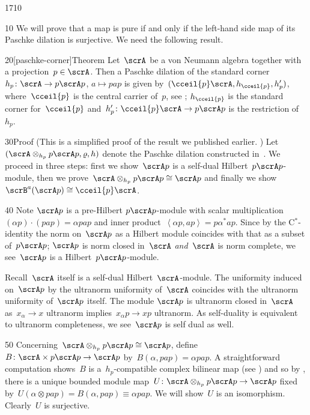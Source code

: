 \begin{parsec}{1710}%
\begin{point}{10}%
We will prove that a map is pure if and only if
    the left-hand side map of its Paschke dilation
    is surjective.  We need the following result.
\end{point}
\begin{point}{20}[paschke-corner]{Theorem}%
Let~$\scrA$ be a von Neumann algebra together with a projection~$p \in \scrA$.
Then a Paschke dilation of the standard corner~$h_p \colon \scrA \to p\scrA p$,
$a \mapsto pap$
is given by~$(\cceil{p}\scrA, h_{\cceil{p}}, h'_p)$,
    where~$\cceil{p}$ is the central  carrier of~$p$,
    see ;
    $h_{\cceil{p}}$ is the standard corner for~$\cceil{p}$
        and~$h'_p \colon \cceil{p} \scrA \to p\scrA p$
        is the restriction of~$h_p$.
\begin{point}{30}{Proof}%
(This is a simplified proof of the result we published earlier.
    \cite[thm.~28]{wwpaschke})
Let~$(\scrA \otimes_{h_p} p\scrA p, \varrho, h)$
    denote the Paschke dilation constructed in~.
We proceed in three steps:
    first we show~$\scrA p$ is a self-dual Hilbert~$p\scrA p$-module,
    then we prove~$\scrA \otimes_{h_p} p\scrA p \cong \scrA p$
    and finally we show~$\scrB^a(\scrA p) \cong \cceil{p} \scrA$.
\begin{point}{40}%
Note $\scrA p$ is a pre-Hilbert $p \scrA p$-module
    with scalar multiplication~$(\alpha p)\cdot (pap) = \alpha pap$
    and inner product~$\left<\alpha p, ap\right> = p\alpha^*ap$.
Since by the C$^*$-identity the norm on~$\scrA p$
    as a Hilbert module coincides with that as a subset of~$p \scrA p$;
    $\scrA p$ is norm closed in~$\scrA$ \emph{and}~$\scrA$ is norm complete,
    we see~$\scrA p$ is a Hilbert~$p \scrA p$-module.

Recall~$\scrA$ itself is a self-dual Hilbert~$\scrA$-module.
The uniformity induced on~$\scrA p$ by the ultranorm uniformity
    of~$\scrA$ coincides with the ultranorm uniformity of~$\scrA p$ itself.
The module $\scrA p$ is ultranorm closed in~$\scrA$
    as~$x_\alpha \to x$ ultranorm
    implies~$x_\alpha p \to xp$ ultranorm.
As self-duality is equivalent to ultranorm completeness,
    we see~$\scrA p$ is self dual as well.
\end{point}
\begin{point}{50}%
Concerning~$\scrA \otimes_{h_p} p \scrA p \cong \scrA p$,
    define~$B\colon \scrA \times  p \scrA p \to \scrA p$
    by~$B(\alpha, pap) = \alpha pap$.
A straightforward computation
    shows~$B$ is a~$h_p$-compatible complex bilinear map
    (see )
    and so by ,  there is a unique bounded module
    map~$U \colon \scrA \otimes_{h_p} p \scrA p \to \scrA p$
    fixed by~$U (\alpha \otimes pap) = B(\alpha,pap) \equiv \alpha pap $.
We will show~$U$ is an isomorphism.
   Clearly~$U$ is surjective.


\end{point}
\end{point}
\end{point}
\end{parsec}
